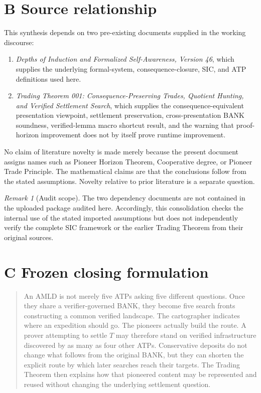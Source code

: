 \documentclass[11pt]{article}
\theoremstyle{remark}
\newtheorem{remark}[definition]{Remark}
\begin{document}
\section*{B Source relationship}
This synthesis depends on two pre-existing documents supplied in the working discourse:
\begin{enumerate}
\item \emph{Depths of Induction and Formalized Self-Awareness, Version 46}, which supplies the underlying formal-system, consequence-closure, SIC, and ATP definitions used here.
\item \emph{Trading Theorem 001: Consequence-Preserving Trades, Quotient Hunting, and Verified Settlement Search}, which supplies the consequence-equivalent presentation viewpoint, settlement preservation, cross-presentation BANK soundness, verified-lemma macro shortcut result, and the warning that proof-horizon improvement does not by itself prove runtime improvement.
\end{enumerate}
No claim of literature novelty is made merely because the present document assigns names such as Pioneer Horizon Theorem, Cooperative degree, or Pioneer Trade Principle. The mathematical claims are that the conclusions follow from the stated assumptions. Novelty relative to prior literature is a separate question.

\begin{remark}[Audit scope]
The two dependency documents are not contained in the uploaded package audited here. Accordingly, this consolidation checks the internal use of the stated imported assumptions but does not independently verify the complete SIC framework or the earlier Trading Theorem from their original sources.
\end{remark}

\section*{C Frozen closing formulation}
\begin{quote}
An AMLD is not merely five ATPs asking five different questions. Once they share a verifier-governed BANK, they become five search fronts constructing a common verified landscape. The cartographer indicates where an expedition should go. The pioneers actually build the route. A prover attempting to settle $T$ may therefore stand on verified infrastructure discovered by as many as four other ATPs. Conservative deposits do not change what follows from the original BANK, but they can shorten the explicit route by which later searches reach their targets. The Trading Theorem then explains how that pioneered content may be represented and reused without changing the underlying settlement question.
\end{quote}
\end{document}
